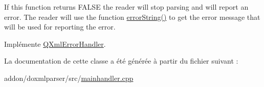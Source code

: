 If this function returns F\+A\+L\+S\+E the reader will stop parsing and will report an error. The reader will use the function \hyperlink{class_error_handler_a193381152001d019c4155600a61c478d}{error\+String()} to get the error message that will be used for reporting the error. 

Implémente \hyperlink{class_q_xml_error_handler_a79ae0cce3316a76b7777c6e90b101afe}{Q\+Xml\+Error\+Handler}.



La documentation de cette classe a été générée à partir du fichier suivant \+:\begin{DoxyCompactItemize}
\item 
addon/doxmlparser/src/\hyperlink{mainhandler_8cpp}{mainhandler.\+cpp}\end{DoxyCompactItemize}
